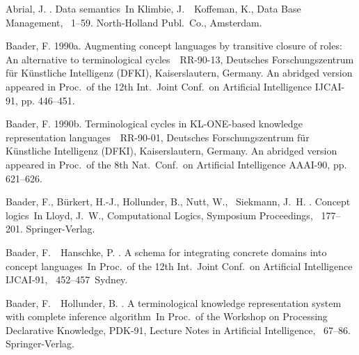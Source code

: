 \begin{thebibliography}{}

Abrial, J. \BBCP.
\newblock \BBOQ Data semantics\BBCQ\
\newblock In Klimbie, J.\BBACOMMA\  \BBA\ Koffeman, K.\BEDS, {\Bem Data Base
  Management}, \BPGS\ 1--59. North-Holland Publ.\ Co., Amsterdam.

Baader, F. \BBOP1990a\BBCP.
\newblock \BBOQ Augmenting concept languages by transitive closure of roles: An
  alternative to terminological cycles\BBCQ\
\newblock \BTR\ RR-90-13, Deutsches Forschungszentrum f{\"u}r K{\"u}nstliche
  Intelligenz (DFKI), Kaiserslautern, Germany.
\newblock An abridged version appeared in {\Bem Proc.\ of the 12th Int.\ Joint
  Conf.\ on Artificial Intelligence IJCAI-91}, pp. 446--451.

Baader, F. \BBOP1990b\BBCP.
\newblock \BBOQ Terminological cycles in {KL-ONE}-based knowledge
  representation languages\BBCQ\
\newblock \BTR\ RR-90-01, Deutsches Forschungszentrum f{\"u}r K{\"u}nstliche
  Intelligenz (DFKI), Kaiserslautern, Germany.
\newblock An abridged version appeared in {\Bem Proc.\ of the 8th Nat.\ Conf.\
  on Artificial Intelligence AAAI-90}, pp. 621--626.

Baader, F., B{\"u}rkert, H.-J., Hollunder, B., Nutt, W., \BBA\ Siekmann, J.~H.
  \BBOP1990\BBCP.
\newblock \BBOQ Concept logics\BBCQ\
\newblock In Lloyd, J.~W.\BED, {\Bem Computational Logics, Symposium
  Proceedings}, \BPGS\ 177--201. Springer-Verlag.

Baader, F.\BBACOMMA\  \BBA\ Hanschke, P. \BBCP.
\newblock \BBOQ A schema for integrating concrete domains into concept
  languages\BBCQ\
\newblock In {\Bem Proc.\ of the 12th Int.\ Joint Conf.\ on Artificial
  Intelligence IJCAI-91}, \BPGS\ 452--457\ Sydney.

Baader, F.\BBACOMMA\  \BBA\ Hollunder, B. \BBCP.
\newblock \BBOQ A terminological knowledge representation system with complete
  inference algorithm\BBCQ\
\newblock In {\Bem Proc.\ of the Workshop on Processing Declarative Knowledge,
  PDK-91}, Lecture Notes in Artificial Intelligence, \BPGS\ 67--86.
  Springer-Verlag.


\end{thebibliography}
